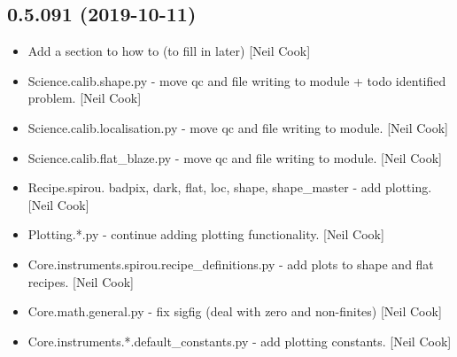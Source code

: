 \documentclass[a4paper,10pt,english]{report}
\begin{document}
\subsection{0.5.091 (2019-10-11)}
\label{\detokenize{misc/changelog:id50}}\begin{itemize}
\item {} 
Add a section to how to (to fill in later) {[}Neil Cook{]}

\item {} 
Science.calib.shape.py - move qc and file writing to module + todo
identified problem. {[}Neil Cook{]}

\item {} 
Science.calib.localisation.py - move qc and file writing to module.
{[}Neil Cook{]}

\item {} 
Science.calib.flat\_blaze.py - move qc and file writing to module.
{[}Neil Cook{]}

\item {} 
Recipe.spirou. badpix, dark, flat, loc, shape, shape\_master - add
plotting. {[}Neil Cook{]}

\item {} 
Plotting.*.py - continue adding plotting functionality. {[}Neil Cook{]}

\item {} 
Core.instruments.spirou.recipe\_definitions.py - add plots to shape and
flat recipes. {[}Neil Cook{]}

\item {} 
Core.math.general.py - fix sigfig (deal with zero and non-finites)
{[}Neil Cook{]}

\item {} 
Core.instruments.*.default\_constants.py - add plotting constants.
{[}Neil Cook{]}

\end{itemize}
\end{document}
